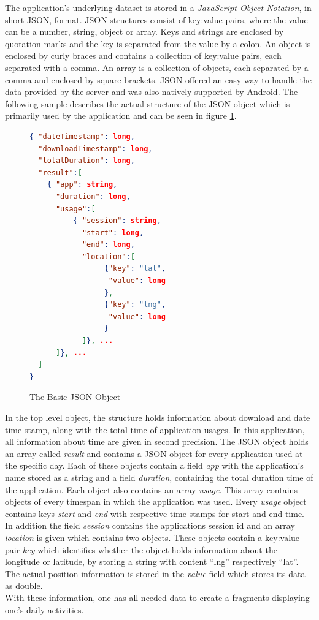 The  application's underlying dataset is stored in a \emph{JavaScript Object Notation}, in short JSON, format. JSON structures consist of  key:value pairs, where the value can be a number, string, object or array. Keys and strings are enclosed by quotation marks and the key is separated from the value by a colon. An object is enclosed by curly braces and contains a collection of key:value pairs, each separated with a comma. An array is a collection of objects, each separated by a comma and enclosed by square brackets. JSON offered an easy way to handle the data provided by the server and was also natively supported by Android. The following sample describes the actual structure of the JSON object which is primarily used by the application and can be seen in figure \ref{fig:jsonobject}.
\begin{figure}
\caption{The Basic JSON Object}
\label{fig:jsonobject}
\begin{lstlisting}[language=json,firstnumber=1]
{ "dateTimestamp": long,
  "downloadTimestamp": long,
  "totalDuration": long,
  "result":[
    { "app": string,
      "duration": long,
      "usage":[
          { "session": string,
            "start": long,
            "end": long,
            "location":[
                 {"key": "lat",
                  "value": long
                 },
                 {"key": "lng",
                  "value": long
                 }
            ]}, ...
      ]}, ...
  ]
}
\end{lstlisting}
\end{figure}

In  the top level object, the structure holds information about download and date time stamp, along with the total time of application usages. In this application, all information about time are given in second precision. The JSON object holds an array called \emph{result} and contains a JSON object for every application used at the specific day. Each of these objects contain a field \emph{app} with the application's name stored as a string and a field \emph{duration}, containing the total duration time of the application. Each object also contains an array \emph{usage}. This array contains objects of every timespan in which the application was used. Every \emph{usage} object contains keys \emph{start} and \emph{end} with respective time stamps for start and end time. In addition the field \emph{session} contains the applications session id and an array \emph{location} is given which contains two objects. These objects contain a key:value pair \emph{key} which identifies whether the object holds information about the longitude or latitude, by storing a string with content ``lng'' respectively ``lat''. The actual position information is stored in the \emph{value} field which stores its data as double.\\
With these information, one has all needed data to create a fragments displaying one's daily activities.

